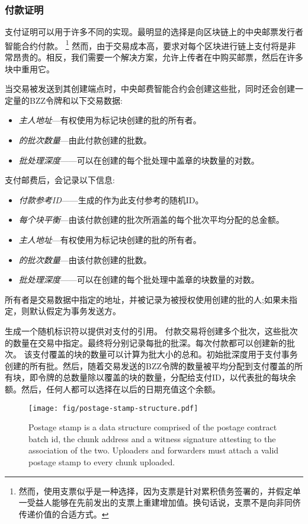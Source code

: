 \subsubsection{付款证明}

支付证明可以用于许多不同的实现。最明显的选择是向区块链上的中央邮票发行者智能合约付款。%
%
\footnote{然而，使用支票似乎是一种选择，因为支票是针对累积债务签署的，并假定单一受益人能够在先前发出的支票上重建增加值。换句话说，支票不是向非同侪传递价值的合适方式。}
%
然而，由于交易成本高，要求对每个区块进行链上支付将是非常昂贵的。相反，我们需要一个解决方案，允许上传者在中购买邮票，然后在许多块中重用它。 


当交易被发送到其创建端点时，中央邮费智能合约会创建这些批，同时还会创建一定量的BZZ令牌和以下交易数据:

\begin{itemize}
\item \emph{主人地址}—有权使用为标记块创建的批的所有者。
\item \emph{的批次数量}—由此付款创建的批数。
\item \emph{批处理深度}——可以在创建的每个批处理中盖章的块数量的对数。
\end{itemize}

支付邮费后，会记录以下信息:

\begin{itemize}
\item \emph{付款参考ID}——生成的作为此支付参考的随机ID。
\item \emph{每个块平衡}—由该付款创建的批次所涵盖的每个批次平均分配的总金额。
\item \emph{主人地址}—有权使用为标记块创建的批的所有者。
\item \emph{的批次数量}—由该付款创建的批数。
\item \emph{批处理深度}——可以在创建的每个批处理中盖章的块数量的对数。
\end{itemize}


所有者是交易数据中指定的地址，并被记录为被授权使用创建的批的人;如果未指定，则默认假定为事务发送方。 

生成一个随机标识符以提供对支付的引用。 
付款交易将创建多个批次，这些批次的数量在交易中指定。最终将分别记录每批的批深。每次付款都可以创建新的批次。
该支付覆盖的块的数量可以计算为批大小的总和。初始批深度用于支付事务创建的所有批。然后，随着交易发送的BZZ令牌的数量被平均分配到支付覆盖的所有块，即令牌的总数量除以覆盖的块的数量，分配给支付ID，以代表批的每块余额。然后，任何人都可以选择在以后的日期充值这个余额。 


\begin{figure}[htbp]
  \centering
    \texttt{[image: fig/postage-stamp-structure.pdf]}
  \caption[Postage stamp \statusgreen]{Postage stamp is a data structure comprised of the postage contract batch id, the chunk address and a witness signature attesting to the association of the two. Uploaders and forwarders must attach a valid postage stamp to every chunk uploaded. }
  \label{fig:postage-stamp}
\end{figure}


